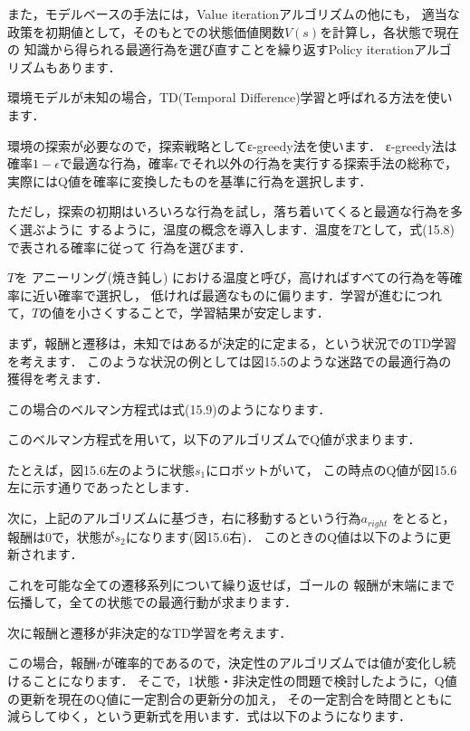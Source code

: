 また，モデルベースの手法には，Value iterationアルゴリズムの他にも，
適当な政策を初期値として，そのもとでの状態価値関数$V(s)$を計算し，各状態で現在の
知識から得られる最適行為を選び直すことを繰り返すPolicy iterationアルゴリズムもあります．


環境モデルが未知の場合，TD(Temporal Difference)学習と呼ばれる方法を使います．

環境の探索が必要なので，探索戦略としてε-greedy法を使います．
ε-greedy法は確率$1-\epsilon$で最適な行為，確率$\epsilon$でそれ以外の行為を実行する探索手法の総称で，
実際にはQ値を確率に変換したものを基準に行為を選択します．

ただし，探索の初期はいろいろな行為を試し，落ち着いてくると最適な行為を多く選ぶように
するように，温度の概念を導入します．温度を$T$として，式(15.8)で表される確率に従って
行為を選びます．

$T$を
アニーリング(焼き鈍し)
における温度と呼び，高ければすべての行為を等確率に近い確率で選択し，
低ければ最適なものに偏ります．学習が進むにつれて，$T$の値を小さくすることで，学習結果が安定します．


まず，報酬と遷移は，未知ではあるが決定的に定まる，という状況でのTD学習を考えます．
このような状況の例としては図15.5のような迷路での最適行為の獲得を考えます．

この場合のベルマン方程式は式(15.9)のようになります．


このベルマン方程式を用いて，以下のアルゴリズムでQ値が求まります．


たとえば，図15.6左のように状態$s_1$にロボットがいて，
この時点のQ値が図15.6左に示す通りであったとします．

次に，上記のアルゴリズムに基づき，右に移動するという行為$a_{right}$
をとると，報酬は0で，状態が$s_2$になります(図15.6右)．
このときのQ値は以下のように更新されます．

 

これを可能な全ての遷移系列について繰り返せば，ゴールの
報酬が末端にまで伝播して，全ての状態での最適行動が求まります．


次に報酬と遷移が非決定的なTD学習を考えます．

この場合，報酬$r$が確率的であるので，決定性のアルゴリズムでは値が変化し続けることになります．
そこで，1状態・非決定性の問題で検討したように，Q値の更新を現在のQ値に一定割合の更新分の加え，
その一定割合を時間とともに減らしてゆく，という更新式を用います．式は以下のようになります．

